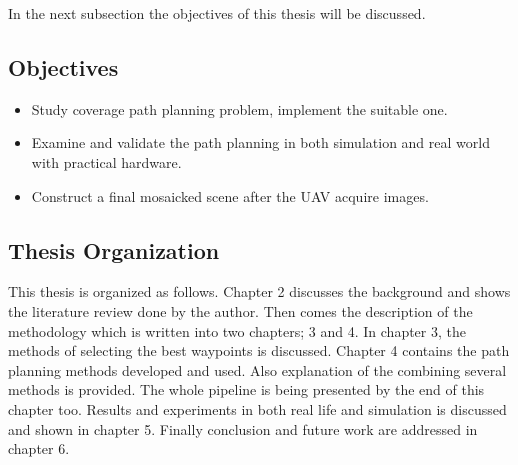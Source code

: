 
In the next subsection the objectives of this thesis will be discussed.

\subsection{Objectives}
\begin{itemize}

\item Study coverage path planning problem, implement the suitable one.
\item Examine and validate the path planning in both simulation and real world with practical hardware.
\item Construct a final mosaicked scene after the UAV acquire images.

\end{itemize}

\subsection{Thesis Organization}
This thesis is organized as follows. Chapter 2 discusses the background and shows the literature review done by the author. Then comes the description of the methodology which is written into two chapters; 3 and 4. In chapter 3, the methods of selecting the best waypoints is discussed. Chapter 4 contains the path planning methods developed and used. Also explanation of the combining several methods is provided. The whole pipeline is being presented by the end of this chapter too. Results and experiments in both real life and simulation is discussed and shown in chapter 5. Finally conclusion and future work are addressed in chapter 6. 